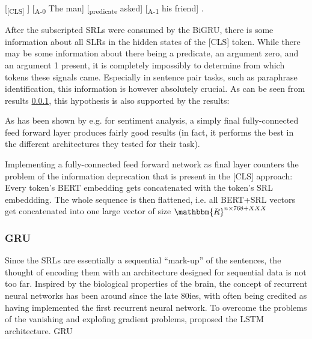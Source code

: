 [\textsubscript{[CLS]} ] [\textsubscript{A-0} The man] [\textsubscript{predicate} asked] [\textsubscript{A-1} his friend] .

After the subscripted SRLs were consumed by the BiGRU, there is some information about all
SLRs in the hidden states of the [CLS] token. While there may be some information about there
being a predicate, an argument zero, and an argument 1 present, it is completely impossibly
to determine from which tokens these signals came. Especially in sentence pair tasks, such
as paraphrase identification, this information is however absolutely crucial. As can be seen
from results \ref{}, this hypothesis is also supported by the results:


As has been shown by e.g. \cite{myagmar2019transferable} for sentiment analysis, a simply final
fully-connected feed forward layer produces fairly good results (in fact, it performs the best
in the different architectures they tested for their task).

Implementing a fully-connected feed forward network as final layer counters the problem of the
information deprecation that is present in the [CLS] approach: Every token's BERT embedding gets
concatenated with the token's SRL embeddding. The whole sequence is then flattened, i.e. all
BERT+SRL vectors get concatenated into one large vector of size $\mathbbm{R}^{n\times768+XXX}$


\subsubsection{GRU}

Since the SRLs are essentially a sequential ``mark-up'' of the sentences, the thought of
encoding them with an architecture designed for sequential data is not too far. Inspired by
the biological properties of the brain, the concept of recurrent neural networks has been
around since the late 80ies, with \citep{hopfield1982neural} often being credited as having
implemented the first recurrent neural network. To overcome the problems of the vanishing
and explofing gradient problems, \citep{hochreiter1997long} proposed the LSTM architecture.
\citep{cho2014learning} GRU

